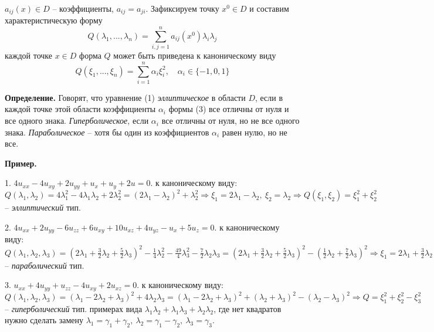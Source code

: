 \documentclass[9pt]{article}
\begin{document}
\par\(a_{ij}(x) \in D\) -- коэффициенты, \(a_{ij} = a_{ji}\). Зафиксируем точку \(x^0 \in D\) и составим характеристическую форму
\begin{equation}
    Q(\lambda_1,...,\lambda_n) = \sum^n_{i,j=1}a_{ij}(x^0)\lambda_i\lambda_j
\end{equation}
 каждой точке \(x \in D\) форма \(Q\) может быть приведена к каноническому виду
\begin{equation}
    Q(\xi_1,...,\xi_n)=\sum^n_{i=1}\alpha_i\xi^2_i,\quad\alpha_i \in \{-1,0,1\}
\end{equation}
\par\textbf{Определение.} Говорят, что уравнение (1) \textit{эллиптическое} в области \(D\), если в каждой точке этой области коэффициенты \(\alpha_i\) формы (3) все отличны от нуля и все одного знака. \textit{Гиперболическое}, если \(\alpha_i\) все отличны от нуля, но не все одного знака. \textit{Параболическое} -- хотя бы один из коэффициентов \(\alpha_i\) равен нулю, но не все.
\par\textbf{Пример.} 
\par1. \(4u_{xx}-4u_{xy}+2u_{yy}+u_x+u_y+2u = 0\).
 к каноническому виду: \(Q(\lambda_1,\lambda_2)=4\lambda_1^2-4\lambda_1\lambda_2+2\lambda_2^2 = (2\lambda_1-\lambda_2)^2+\lambda_2^2 \Rightarrow \xi_1=2\lambda_1-\lambda_2,\ \xi_2=\lambda_2 \Rightarrow Q(\xi_1,\xi_2)=\xi_1^2+\xi_2^2\) -- \textit{эллиптический} тип.
\par2. \(4u_{xx}+2u_{yy}-6u_{zz}+6u_{xy}+10u_{xz}+4u_{yz}-u_x+5u_z=0\).
 к каноническому виду: \(Q(\lambda_1,\lambda_2,\lambda_3)=(2\lambda_1+\frac{3}{2}\lambda_2+\frac{5}{2}\lambda_3)^2-\frac{1}{4}\lambda_2^2-\frac{49}{4}\lambda_3^2-\frac{7}{2}\lambda_2\lambda_3=(2\lambda_1+\frac{3}{2}\lambda_2+\frac{5}{2}\lambda_3)^2-(\frac{1}{2}\lambda_2+\frac{7}{2}\lambda_3)^2 \Rightarrow \xi_1=2\lambda_1+\frac{3}{2}\lambda_2+\frac{5}{2}\lambda_3,\ \xi_2 = \frac{1}{2}\lambda_2+\frac{7}{2}\lambda_3,\ \xi_3=\lambda_3 \Rightarrow Q(\xi_1,\xi_2,\xi_3)=\xi_1^2-\xi_2^2+0\cdot\xi_3^2\) -- \textit{параболический} тип.
\par3. \(u_{xx}+4u_{yy}+u_{zz}-4u_{xy}+2u_{xz}=0\).
 к каноническому виду: \(Q(\lambda_1,\lambda_2,\lambda_3)=(\lambda_1-2\lambda_2+\lambda_3)^2+4\lambda_2\lambda_3=(\lambda_1-2\lambda_2+\lambda_3)^2+(\lambda_2+\lambda_3)^2-(\lambda_2-\lambda_3)^2 \Rightarrow Q = \xi_1^2+\xi_2^2-\xi_3^2\) -- \textit{гиперболический} тип.
 примерах вида \(\lambda_1\lambda_2+\lambda_1\lambda_3+\lambda_2\lambda_2\), где нет квадратов нужно сделать замену \(\lambda_1=\gamma_1+\gamma_2,\ \lambda_2=\gamma_1-\gamma_2,\ \lambda_3=\gamma_3\).
\end{document}
